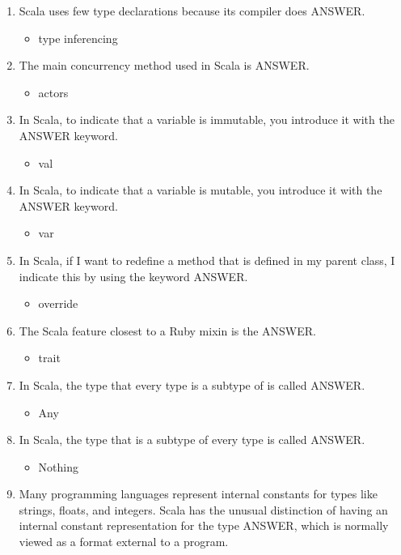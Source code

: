 \documentclass{exam}
\begin{document}
\begin{enumerate}
\item Scala uses few type declarations because its compiler does ANSWER.
\begin{itemize}
\item type inferencing
\end{itemize}
\item The main concurrency method used in Scala is ANSWER.
\begin{itemize}
\item actors
\end{itemize}
\item In Scala, to indicate that a variable is immutable, you introduce it with the ANSWER keyword.
\begin{itemize}
\item val
\end{itemize}
\item In Scala, to indicate that a variable is mutable, you introduce it with the ANSWER keyword.
\begin{itemize}
\item var
\end{itemize}
\item In Scala, if I want to redefine a method that is defined in my parent class, I indicate this by using the keyword ANSWER.
\begin{itemize}
\item override
\end{itemize}
\item The Scala feature closest to a Ruby mixin is the ANSWER.
\begin{itemize}
\item trait
\end{itemize}
\item In Scala, the type that every type is a subtype of is called ANSWER.
\begin{itemize}
\item Any
\end{itemize}
\item In Scala, the type that is a subtype of every type is called ANSWER.
\begin{itemize}
\item Nothing
\end{itemize}
\item Many programming languages represent internal constants for types like strings, floats, and integers.  Scala has the unusual distinction of having an internal constant representation for the type ANSWER, which is normally viewed as a format external to a program.

\end{enumerate}
\end{document}
